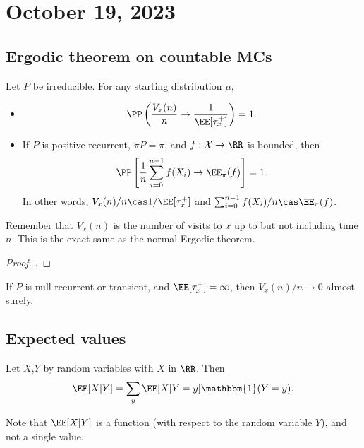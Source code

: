 \section{October 19, 2023}

\subsection{Ergodic theorem on countable MCs}

\begin{theorem}
\thmlabel

Let $P$ be irreducible. For any starting distribution $\mu$, 

\begin{itemize}
	\item \[\PP\left(\frac{V_x(n)}{n} \rightarrow \frac{1}{\EE[\tau_x^+]}\right) = 1.\]
	\item If $P$ is positive recurrent, $\pi P = \pi$, and $f : \mathcal{X}\rightarrow \RR$ is bounded, then 
		\[\PP\left[\frac{1}{n}\sum_{i = 0}^{n-1}f(X_i)\rightarrow \EE_{\pi}(f)\right] = 1.\] 
		In other words, $V_x(n)/n\cas 1/\EE[\tau_x^+]$ and $\sum_{i=0}^{n-1}f(X_i)/n\cas \EE_{\pi}(f)$. 
\end{itemize}
\end{theorem}

Remember that $V_x(n)$ is the number of visits to $x$ up to but not including time $n$. This is the exact same as the normal Ergodic theorem. 

\begin{proof}
.
\end{proof}

\begin{theorem}
\corlabel

If $P$ is null recurrent or transient, and $\EE[\tau_x^+] = \infty$, then $V_x(n)/n\rightarrow 0$ almost surely. 
\end{theorem}

\subsection{Expected values}

\begin{definition}

Let $X$,$Y$ by random variables with $X$ in $\RR$. Then 
\[\EE[X|Y] = \sum_y \EE[X|Y=y]\mathbbm{1}(Y=y).\] 
\end{definition}

Note that $\EE[X|Y]$ is a function (with respect to the random variable $Y$), and not a single value.

